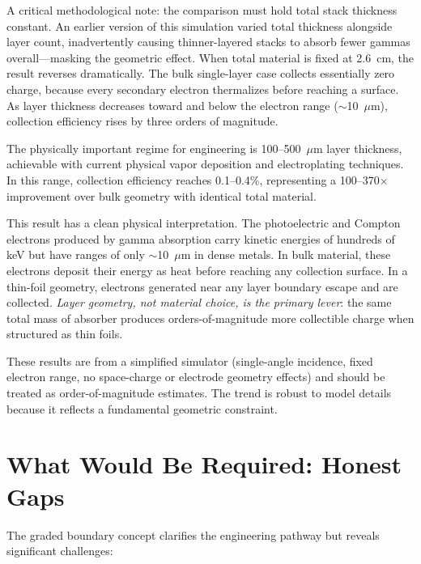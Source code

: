 \documentclass[12pt]{article}
\begin{document}
A critical methodological note: the comparison must hold total stack thickness constant.
An earlier version of this simulation varied total thickness alongside layer count,
inadvertently causing thinner-layered stacks to absorb fewer gammas overall---masking
the geometric effect. When total material is fixed at 2.6~cm, the result reverses
dramatically. The bulk single-layer case collects essentially zero charge, because
every secondary electron thermalizes before reaching a surface. As layer thickness
decreases toward and below the electron range ($\sim$10~$\mu$m), collection efficiency
rises by three orders of magnitude.

The physically important regime for engineering is 100--500~$\mu$m layer thickness,
achievable with current physical vapor deposition and electroplating techniques. In this
range, collection efficiency reaches 0.1--0.4\%, representing a 100--370$\times$
improvement over bulk geometry with identical total material.

This result has a clean physical interpretation. The photoelectric and Compton electrons
produced by gamma absorption carry kinetic energies of hundreds of keV but have ranges
of only $\sim$10~$\mu$m in dense metals. In bulk material, these electrons deposit their
energy as heat before reaching any collection surface. In a thin-foil geometry,
electrons generated near any layer boundary escape and are collected. \emph{Layer
geometry, not material choice, is the primary lever}: the same total mass of absorber
produces orders-of-magnitude more collectible charge when structured as thin foils.

These results are from a simplified simulator (single-angle incidence, fixed electron
range, no space-charge or electrode geometry effects) and should be treated as
order-of-magnitude estimates. The trend is robust to model details because it reflects
a fundamental geometric constraint.

\section{What Would Be Required: Honest Gaps}

The graded boundary concept clarifies the engineering pathway but reveals significant
challenges:
\end{document}
